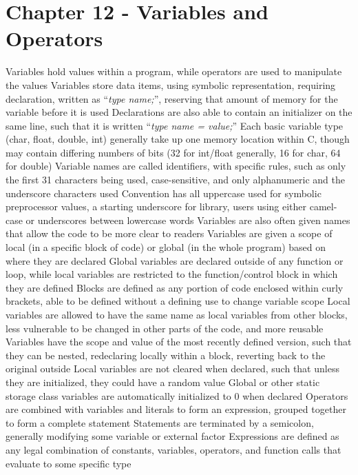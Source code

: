 \documentclass[11 pt, twoside]{article}
\newenvironment{outline*}
{
	\begin{outline}[enumerate]
	}
	{\end{outline}
}
\begin{document}
\section{Chapter 12 - Variables and Operators}
\begin{outline*}
\1 Variables hold values within a program, while operators are used to manipulate the values
\2 Variables store data items, using symbolic representation, requiring declaration, written as ``\textit{type name;}'', reserving that amount of memory for the variable before it is used
\2 Declarations are also able to contain an initializer on the same line, such that it is written ``\textit{type name = value;}''
\2 Each basic variable type (char, float, double, int) generally take up one memory location within C, though may contain differing numbers of bits (32 for int/float generally, 16 for char, 64 for double)
\2 Variable names are called identifiers, with specific rules, such as only the first 31 characters being used, case-sensitive, and only alphanumeric and the underscore characters used
\3 Convention has all uppercase used for symbolic preprocessor values, a starting underscore for library, users using either camel-case or underscores between lowercase words
\3 Variables are also often given names that allow the code to be more clear to readers
\2 Variables are given a scope of local (in a specific block of code) or global (in the whole program) based on where they are declared
\3 Global variables are declared outside of any function or loop, while local variables are restricted to the function/control block in which they are defined
\3 Blocks are defined as any portion of code enclosed within curly brackets, able to be defined without a defining use to change variable scope
\3 Local variables are allowed to have the same name as local variables from other blocks, less vulnerable to be changed in other parts of the code, and more reusable
\3 Variables have the scope and value of the most recently defined version, such that they can be nested, redeclaring locally within a block, reverting back to the original outside
\2 Local variables are not cleared when declared, such that unless they are initialized, they could have a random value
\3 Global or other static storage class variables are automatically initialized to 0 when declared
\1 Operators are combined with variables and literals to form an expression, grouped together to form a complete statement
\2 Statements are terminated by a semicolon, generally modifying some variable or external factor
\2 Expressions are defined as any legal combination of constants, variables, operators, and function calls that evaluate to some specific type

\end{outline*}
\end{document}
